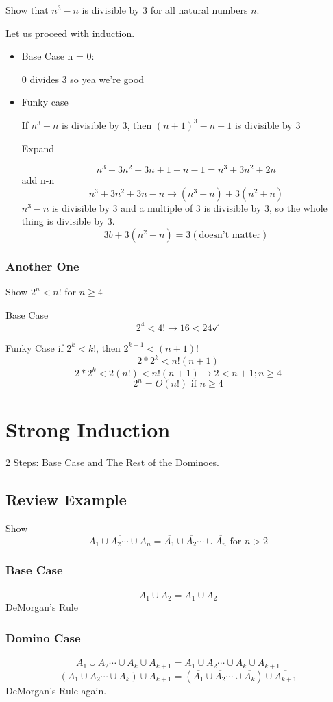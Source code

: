 \documentclass{report}
\begin{document}
\noindent Show that $n^3 - n$ is divisible by 3 for all natural numbers $n$.

Let us proceed with induction.

\begin{itemize}
\item
Base Case n = 0:

0 divides 3 so yea we're good

\item
Funky case 

If $n^3 - n$ is divisible by 3, then $(n+1)^3 - n-1$ is divisible by 3

Expand

\[
n^3 + 3n^2 + 3n + 1 - n - 1 =  n^3 + 3n^2 + 2n
\]
add n-n
\[
n^3 + 3n^2 + 3n - n \rightarrow
(n^3 - n) + 3(n^2+n)
\]
$n^3 - n$ is divisible by 3 and a multiple of 3 is divisible by 3, so the whole thing is divisible by 3.
\[
3b + 3(n^2+n) = 3(\textrm{doesn't matter})
\]
\end{itemize}


\subsection{Another One}
Show $2^n < n!$ for $n \geq 4$

Base Case
\[
2^4 < 4! \rightarrow 16 < 24 \checkmark
\]

Funky Case
if $2^k < k!$, then $2^{k+1} < (n+1)!$
\[
2*2^k < n! (n+1)
\]
\[
2*2^k < 2(n!) < n! (n+1) \longrightarrow
2 < n+1; n \geq 4
\]
\[
2^n = O(n!) \textrm{ if } n \geq 4
\]


\chapter{Strong Induction}
2 Steps: Base Case and The Rest of the Dominoes.

\section{Review Example}
Show 
\[
\overline{A_1 \cup A_2 \cdots \cup A_n} = \overline{A_1} \cup \overline{A_2} \cdots \cup \overline{A_n} 
\text{ for $n > 2$}
\]

\subsection{Base Case}
\[
\overline{A_1 \cup A_2} = \overline{A_1} \cup \overline{A_2}
\]
DeMorgan's Rule

\newpage
\subsection{Domino Case}
\[
\overline{A_1 \cup A_2 \cdots \cup A_k \cup A_{k+1}} = \overline{A_1} \cup \overline{A_2} \cdots \cup \overline{A_k} \cup \overline{A_{k+1}} 
\]
\[
\overline{\left(A_1 \cup A_2 \cdots \cup A_k\right) \cup A_{k+1}} = \left( \overline{A_1} \cup \overline{A_2} \cdots \cup \overline{A_k} \right) \cup \overline{A_{k+1}} 
\]
DeMorgan's Rule again.
\end{document}
